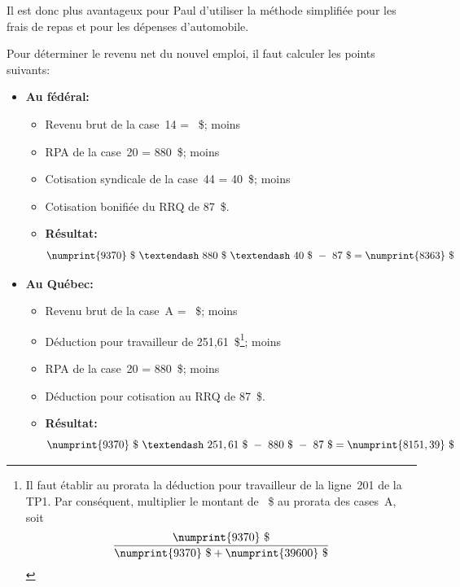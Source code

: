 Il est donc plus avantageux pour Paul d'utiliser la méthode simplifiée pour les frais de repas et pour les dépenses d'automobile.

Pour déterminer le revenu net du nouvel emploi, il faut calculer les points suivants:
\begin{itemize}
	\item \textbf{Au fédéral:}
	\begin{itemize}
		\item Revenu brut de la case~14 = ~\$;  moins
		\item RPA de la case~20 = 880~\$;  moins
		\item Cotisation syndicale de la case~44 = 40~\$;  moins
		\item Cotisation bonifiée du RRQ de 87~\$. 
		\item \textbf{Résultat:} \[ \numprint{9370}~\$~–~880~\$~–~40~\$~-~87~\$ = \numprint{8 363}~\$ \]
	\end{itemize}
	\item \textbf{Au Québec:}
	\begin{itemize}
		\item Revenu brut de la case~A = ~\$;  moins
		\item Déduction pour travailleur de 251,61~\$\footnote{Il faut établir au prorata la déduction pour travailleur de la ligne~201 de la TP1. Par conséquent, multiplier le montant de ~\$ au prorata des cases~A, soit \[ \frac{\numprint{9370}~\$}{\numprint{9370}~\$ + \numprint{39600}~\$} \]};  moins                                                                                                                               
		\item RPA de la case~20 = 880~\$;  moins
		\item Déduction pour cotisation au RRQ de 87~\$. 
		\item \textbf{Résultat:} \[ \numprint{9370}~\$~–~251,61~\$~-~880~\$~-~87~\$ = \numprint{8151,39}~\$ \]
	\end{itemize}
\end{itemize}

